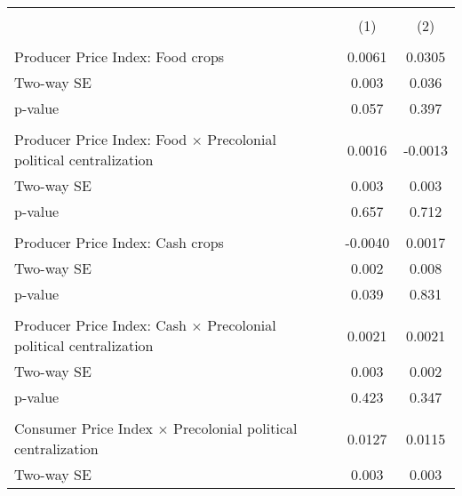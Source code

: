 {
\def\sym#1{\ifmmode^{#1}\else\(^{#1}\)\fi}
\begin{tabular}{l*{2}{c}}
\hline\hline
                    &\\\cmidrule(lr){2-3}
                    &         &         \\
\hline
\hline
\\ Producer Price Index: Food crops&      0.0061         &      0.0305         \\
\hspace{15pt} Two-way SE&       0.003         &       0.036         \\
\hspace{25pt} p-value&       0.057         &       0.397         \\
\\ Producer Price Index: Food $\times$ Precolonial political centralization&      0.0016         &     -0.0013         \\
\hspace{15pt} Two-way SE&       0.003         &       0.003         \\
\hspace{25pt} p-value&       0.657         &       0.712         \\
\\ Producer Price Index: Cash crops&     -0.0040         &      0.0017         \\
\hspace{15pt} Two-way SE&       0.002         &       0.008         \\
\hspace{25pt} p-value&       0.039         &       0.831         \\
\\ Producer Price Index: Cash $\times$ Precolonial political centralization&      0.0021         &      0.0021         \\
\hspace{15pt} Two-way SE&       0.003         &       0.002         \\
\hspace{25pt} p-value&       0.423         &       0.347         \\
\\ Consumer Price Index $\times$ Precolonial political centralization&      0.0127         &      0.0115         \\
\hspace{15pt} Two-way SE&       0.003         &       0.003         \\

\end{tabular}}
